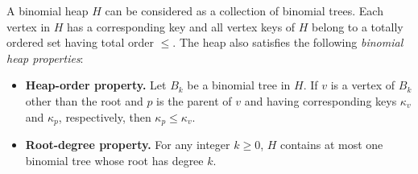 A binomial heap $H$ can be considered as a
collection of binomial trees. Each vertex in $H$ has a corresponding
key and all vertex keys of $H$ belong to a totally ordered set having
total order $\leq$. The heap also satisfies the following
\emph{binomial heap properties}:
\begin{itemize}
\item \textbf{Heap-order property.}
  Let $B_k$ be a binomial tree in $H$. If $v$ is a vertex of $B_k$
  other than the root and $p$ is the parent of $v$ and having
  corresponding keys $\kappa_v$ and $\kappa_p$, respectively, then
  $\kappa_p \leq \kappa_v$.

\item \textbf{Root-degree property.}
  For any integer $k \geq 0$, $H$ contains at most one binomial tree
  whose root has degree $k$.
\end{itemize}

